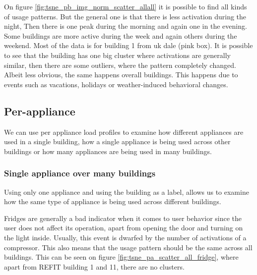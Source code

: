 On figure \ref{fig:tsne_pb_img_norm_scatter_allall} it is possible to find all kinds of 
usage patterns. But the general one is that there is less activation during the night,
Then there is one peak during the morning and again one in the evening.
Some buildings are more active during the week and again others during the weekend.
Most of the data is for building 1 from uk dale (pink box). It is possible to see that the building
has one big cluster where activations are generally similar, then there are some outliers,
where the pattern completely changed. Albeit less obvious, the same happens overall buildings.
This happens due to events such as vacations, holidays or weather-induced behavioral changes.

\subsection{Per-appliance}

We can use per appliance load profiles to examine how different appliances 
are used in a single building, how a single appliance is being used across other buildings
or how many appliances are being used in many buildings.

\subsubsection{Single appliance over many buildings}

Using only one appliance and using the building as a label,
allows us to examine how the same type of appliance is being used across different buildings.

Fridges are generally a bad indicator when it comes to user behavior since the user does not affect 
its operation, apart from opening the door and turning on the light inside. 
Usually, this event is dwarfed by the number of activations of a compressor. 
This also means that the usage pattern should be the same across all buildings. 
This can be seen on figure \ref{fig:tsne_pa_scatter_all_fridge}, 
where apart from REFIT building 1 and 11, there are no clusters.

